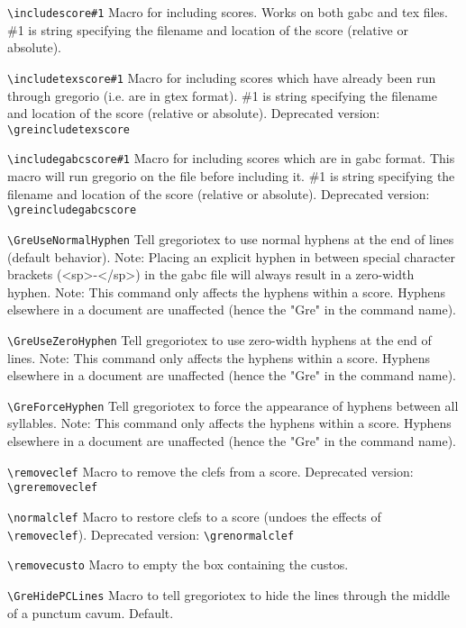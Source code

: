 \verb=\includescore#1=%
	Macro for including scores.  Works on both gabc and tex files.  \#1 is string specifying the filename and location of the score (relative or absolute).

\verb=\includetexscore#1=%
	Macro for including scores which have already been run through gregorio (i.e. are in gtex format).  \#1 is string specifying the filename and location of the score (relative or absolute).
	Deprecated version: \verb=\greincludetexscore=

\verb=\includegabcscore#1=%
	Macro for including scores which are in gabc format.  This macro will run gregorio on the file before including it.  \#1 is string specifying the filename and location of the score (relative or absolute).
	Deprecated version: \verb=\greincludegabcscore=

\verb=\GreUseNormalHyphen=%
	Tell gregoriotex to use normal hyphens at the end of lines (default behavior).
	Note: Placing an explicit hyphen in between special character brackets (\ie <sp>-</sp>) in the gabc file will always result in a zero-width hyphen.
	Note: This command only affects the hyphens within a score.  Hyphens elsewhere in a document are unaffected (hence the "Gre" in the command name).
	
\verb=\GreUseZeroHyphen=%
	Tell gregoriotex to use zero-width hyphens at the end of lines.
	Note: This command only affects the hyphens within a score.  Hyphens elsewhere in a document are unaffected (hence the "Gre" in the command name).

\verb=\GreForceHyphen=%
	Tell gregoriotex to force the appearance of hyphens between all syllables.
	Note: This command only affects the hyphens within a score.  Hyphens elsewhere in a document are unaffected (hence the "Gre" in the command name).

\verb=\removeclef=%
	Macro to remove the clefs from a score.
	Deprecated version: \verb=\greremoveclef=

\verb=\normalclef=%
	Macro to restore clefs to a score (undoes the effects of \verb=\removeclef=).
	Deprecated version: \verb=\grenormalclef=

\verb=\removecusto=%
	Macro to empty the box containing the custos.

\verb=\GreHidePCLines=%
	Macro to tell gregoriotex to hide the lines through the middle of a punctum cavum.  Default.

